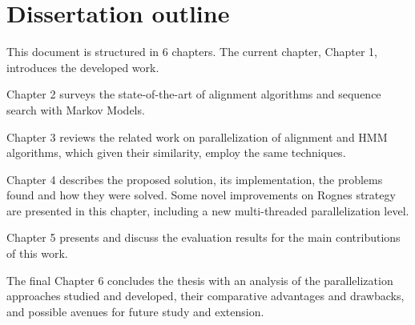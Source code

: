 \documentclass[defaultstyle,10pt,master,Helvetica]{thesis}
\begin{document}

\section{Dissertation outline}

This document is structured in 6 chapters. The current chapter, Chapter 1, introduces the developed work.

Chapter 2 surveys the state-of-the-art of alignment algorithms and sequence search with Markov Models.

Chapter 3 reviews the related work on parallelization of alignment and HMM algorithms, which given their similarity, employ the same techniques.

Chapter 4 describes the proposed solution, its implementation, the problems found and how they were solved. Some novel improvements on Rognes strategy are presented in this chapter, including a new multi-threaded parallelization level.

Chapter 5 presents and discuss the evaluation results for the main contributions of this work.

The final Chapter 6 concludes the thesis with an analysis of the parallelization approaches studied and developed, their comparative advantages and drawbacks, and possible avenues for future study and extension.

\clearpage





















% 

% 

\cleardoublepage


\end{document}
